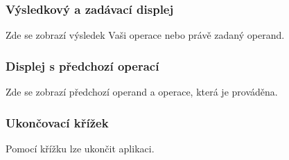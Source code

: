 \documentclass[a5paper,8pt,twoside]{extarticle}
\begin{document}
    \subsubsection{Výsledkový a zadávací displej}
    Zde se zobrazí výsledek Vaši operace nebo právě zadaný operand.

    \subsubsection{Displej s předchozí operací}
    Zde se zobrazí předchozí operand a operace, která je prováděna.

    \subsubsection{Ukončovací křížek}
    Pomocí křížku lze ukončit aplikaci.

    \newpage
\end{document}
